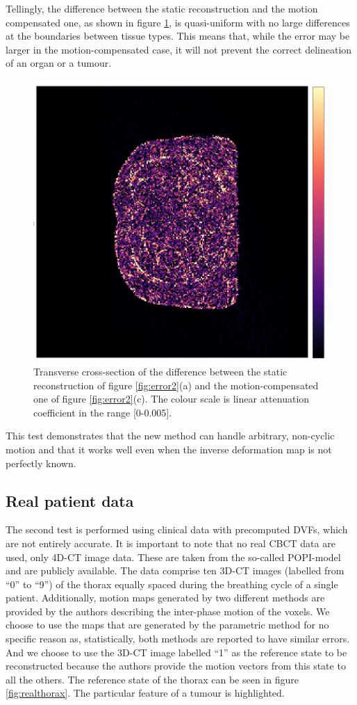 Tellingly, the difference between the static reconstruction and the motion compensated one, as shown in figure \ref{fig:error23}, is quasi-uniform with no large differences at the boundaries between tissue types.  This means that, while the error may be larger in the motion-compensated case, it will not prevent the correct delineation of an organ or a tumour.

\begin{figure}[ht]
\begin{center}
\includegraphics[width=0.6\linewidth]{MotionCorrection/motion2errorXCAT2.png} 
\end{center}
\caption[Error between SART and MC-SART]{\label{fig:error23} Transverse cross-section of the difference between the static reconstruction of figure \ref{fig:error2}(a) and the motion-compensated one of figure \ref{fig:error2}(c). The colour scale is linear attenuation coefficient in the range [0-0.005].} 
\end{figure}

This test demonstrates that the new method can handle arbitrary, non-cyclic motion and that it works well even when the inverse deformation map is not perfectly known.


\FloatBarrier
\subsection{Real patient data}

The second test is performed using clinical data with precomputed DVFs, which are not entirely accurate.  It is important to note that no real CBCT data are used, only 4D-CT image data.  These are taken from the so-called POPI-model\cite{vandemeulebroucke2007popi} and are publicly available\cite{popi-modelweb}.  The data comprise ten 3D-CT images (labelled from ``0'' to ``9'') of the thorax equally spaced during the breathing cycle of a single patient.  Additionally, motion maps generated by two different methods are provided by the authors describing the inter-phase motion of the voxels.  We choose to use the maps that are generated by the parametric method for no specific reason as, statistically, both methods are reported to have similar errors.  And we choose to use the 3D-CT image labelled ``1'' as the reference state to be reconstructed because the authors provide the motion vectors from this state to all the others.  The reference state of the thorax can be seen in figure \ref{fig:realthorax}.  The particular feature of a tumour is highlighted.

